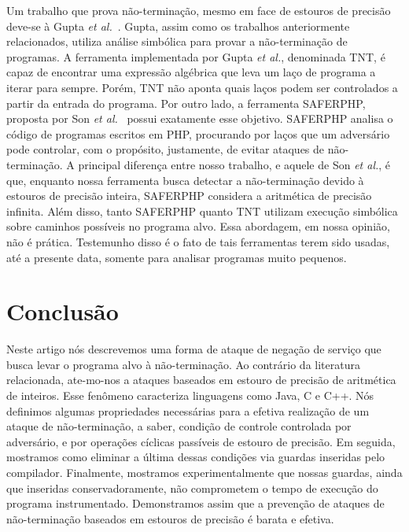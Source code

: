 \documentclass{llncs}
\begin{document}
Um trabalho que prova não-terminação, mesmo em face de estouros de precisão
deve-se à Gupta {\em et al.}~\cite{Gupta08}.
Gupta, assim como os trabalhos anteriormente relacionados, utiliza análise
simbólica para provar a não-terminação de programas.
A ferramenta implementada por Gupta {\em et al.}, denominada TNT, é capaz de
encontrar uma expressão algébrica que leva um laço de programa a iterar
para sempre.
Porém, TNT não aponta quais laços podem ser controlados a partir da entrada
do programa.
Por outro lado, a ferramenta  SAFERPHP, proposta por Son
{\em et al.}~\cite{Son11} possui exatamente esse objetivo.
SAFERPHP analisa o código de programas escritos em PHP, procurando por laços
que um adversário pode controlar, com o propósito, justamente, de evitar
ataques de não-terminação.
A principal diferença entre nosso trabalho, e aquele de Son {\em et al.}, é
que, enquanto nossa ferramenta busca detectar a não-terminação devido à
estouros de precisão inteira, SAFERPHP considera a aritmética de
precisão infinita.
Além disso, tanto SAFERPHP quanto TNT utilizam execução simbólica sobre caminhos
possíveis no programa alvo.
Essa abordagem, em nossa opinião, não é prática.
Testemunho disso é o fato de tais ferramentas terem sido usadas, até a presente
data, somente para analisar programas muito pequenos.

\section{Conclusão}
\label{sec:con}

Neste artigo nós descrevemos uma forma de ataque de negação de serviço que
busca levar o programa alvo à não-terminação.
Ao contrário da literatura relacionada, ate-mo-nos a ataques baseados em
estouro de precisão de aritmética de inteiros.
Esse fenômeno caracteriza linguagens como Java, C e C++.
Nós definimos algumas propriedades necessárias para a efetiva realização de
um ataque de não-terminação, a saber, condição de controle controlada por
adversário, e por operações cíclicas passíveis de estouro de precisão.
Em seguida, mostramos como eliminar a última dessas condições via guardas
inseridas pelo compilador.
Finalmente, mostramos experimentalmente que nossas guardas, ainda que inseridas
conservadoramente, não comprometem o tempo de execução do programa
instrumentado.
Demonstramos assim que a prevenção de ataques de não-terminação baseados em
estouros de precisão é barata e efetiva.
\end{document}
